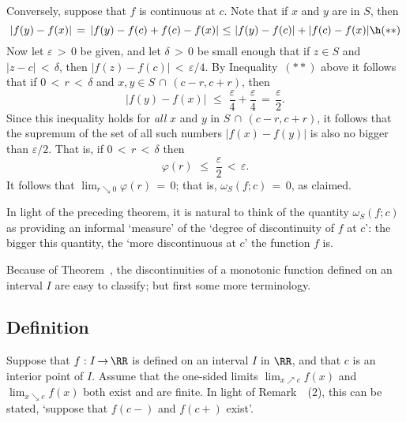         Conversely, suppose that $f$ is continuous at $c$.
    Note that if $x$ and $y$ are in $S$, then
        \begin{displaymath}
        |f(y)-f(x)| \,=\, |f(y)-f(c)+f(c)-f(x)|\,\,{\leq}\,\,|f(y)-f(c)|+|f(c)-f(x)| \h ({\ast}{\ast})
        \end{displaymath}
    Now let ${\varepsilon}\,>\,0$ be given, and let ${\delta}\,>\,0$ be small enough that if $z{\in}S$ and $|z-c|\,<\,{\delta}$,
    then $|f(z)-f(c)|\,<\,{\varepsilon}/4$.
    By Inequality~$({\ast}{\ast})$ above it follows that if $0\,<\,r\,<\,{\delta}$ and $x,y{\in}S\,{\cap}\,(c-r,c+r)$, then
        \begin{displaymath}
        |f(y)-f(x)|\,\,{\leq}\,\,\frac{{\varepsilon}}{4}+\frac{{\varepsilon}}{4} \,=\, \frac{{\varepsilon}}{2}.
        \end{displaymath}
    Since this inequality holds for {\em all} $x$ and $y$ in $S\,{\cap}\,(c-r,c+r)$, it follows that the supremum of the set of all such numbers $|f(x)-f(y)|$ is also no bigger than ${\varepsilon}/2$.
    That is, if $0\,<\,r\,<\,{\delta}$ then
        \begin{displaymath}
        {\varphi}(r)\,\,{\leq}\,\,\frac{{\varepsilon}}{2}\,<\,{\varepsilon}.
        \end{displaymath}
    It follows that $\lim_{r{\searrow}0} {\varphi}(r) \,=\, 0$; that is, ${\omega}_{S}(f;c) \,=\, 0$,  as claimed.

\V
\V

        In light of the preceding theorem, it is natural to think of the quantity ${\omega}_{S}(f;c)$ as providing an informal `measure' of the `degree of discontinuity of $f$ at $c$':
    the bigger this quantity, the `more discontinuous at $c$' the function $f$ is.


\V
\V

        Because of Theorem~, the discontinuities of a monotonic function defined on an interval $I$ are easy to classify;
    but first some more terminology.


\V
\V

             \subsection{\small{\bf Definition}}
            \label{DefF40.60}

        Suppose that $f:I \,{\rightarrow}\, {\RR}$ is defined on an interval $I$ in ${\RR}$, and that $c$ is an interior point of $I$.
    Assume that the one-sided limits $\lim_{x{\nearrow}c} f(x)$ and $\lim_{x{\searrow}c} f(x)$ both exist and are finite.
    In light of Remark~~(2), this can be stated, `suppose that $f(c-)$ and $f(c+)$ exist'.

